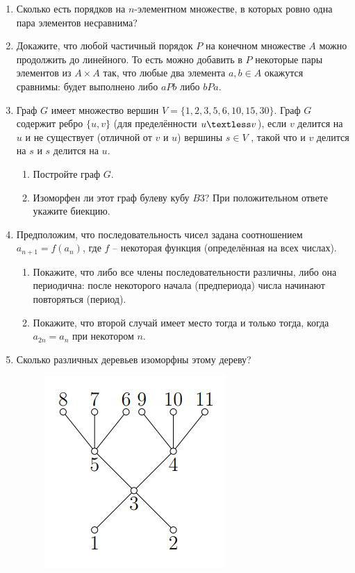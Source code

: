 \documentclass[12pt]{article}
\begin{document}
\begin{enumerate}[label={\textbf{\arabic{section}.\arabic*}}]
		\item  Сколько есть порядков на $n$-элементном множестве, в которых ровно одна пара элементов несравнима?
		
		\item Докажите, что любой частичный порядок $P$ на конечном множестве $A$ можно продолжить до линейного. То есть можно добавить в $P$ некоторые пары элементов из $A\times A$ так, что любые два элемента $a, b\in A$ окажутся сравнимы: будет выполнено либо $aPb$ либо $bPa$.
		
		\item Граф $G$ имеет множество вершин $V = \{1, 2, 3, 5, 6, 10, 15, 30\}$. Граф $G$ содержит ребро $\{u, v\}$ (для пределённости $u\textless v$), если $v$ делится на $u$ и не существует (отличной от $v$ и $u$) вершины $s\in V$ , такой что и $v$ делится на $s$ и $s$ делится на $u$.
		\begin{enumerate}[label=\textbf{\alph*)}]
			\item Постройте граф $G$.
			\item Изоморфен ли этот граф булеву кубу $B3$? При положительном ответе укажите биекцию.
		\end{enumerate}
		
		\item Предположим, что последовательность чисел задана соотношением $a_{n+1} = f(a_n)$, где $f$ -- некоторая функция (определённая на всех числах).
		\begin{enumerate}[label=\textbf{\alph*)}]
			\item Покажите, что либо все члены последовательности различны, либо она периодична: после некоторого начала (предпериода) числа начинают повторяться (период).
			\item Покажите, что второй случай имеет место тогда и только тогда, когда $a_{2n} = a_n$ при некотором $n$.

		\end{enumerate}
		
		\item Сколько различных деревьев изоморфны этому дереву?
		
		\begin{figure}[h]
			\centering
			\includegraphics[width=0.4\linewidth]{11}
		\end{figure}
	

\end{enumerate}
\end{document}
